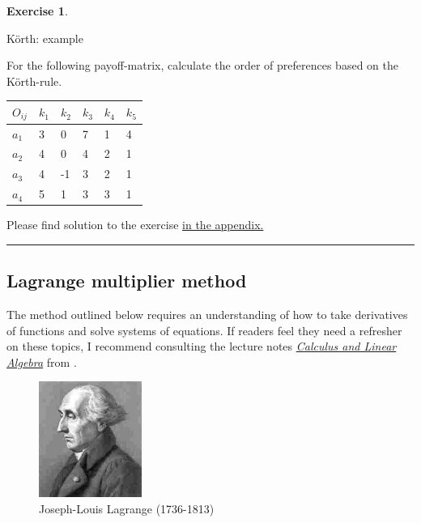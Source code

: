 \documentclass[
  12pt,
  oneside]{book}
\theoremstyle{definition}
\theoremstyle{definition}
\theoremstyle{definition}
\newtheorem{exercise}{Exercise}[chapter]
\theoremstyle{definition}
\theoremstyle{remark}
\begin{document}
\begin{exercise}
\protect\hypertarget{exr:koerth-example}{}\label{exr:koerth-example}

Körth: example

For the following payoff-matrix, calculate the order of preferences based on the Körth-rule.

\begin{longtable}[]{@{}llllll@{}}
\toprule\noalign{}
\(O_{ij}\) & \(k_1\) & \(k_2\) & \(k_3\) & \(k_4\) & \(k_5\) \\
\midrule\noalign{}
\endhead
\bottomrule\noalign{}
\endlastfoot
\(a_1\) & 3 & 0 & 7 & 1 & 4 \\
\(a_2\) & 4 & 0 & 4 & 2 & 1 \\
\(a_3\) & 4 & -1 & 3 & 2 & 1 \\
\(a_4\) & 5 & 1 & 3 & 3 & 1 \\
\end{longtable}

Please find solution to the exercise \hyperref[sol:koerth-example]{in the appendix.}

\begin{center}\rule{0.5\linewidth}{0.5pt}\end{center}

\end{exercise}

\subsection{Lagrange multiplier method}\label{lagrange-multiplier-method}

The method outlined below requires an understanding of how to take derivatives of functions and solve systems of equations. If readers feel they need a refresher on these topics, I recommend consulting the lecture notes \href{https://raw.githubusercontent.com/hubchev/courses/main/pdfs/cla_A4.pdf}{\emph{Calculus and Linear Algebra}} from \citet{Huber2023Mathematics}.

\begin{figure}
\centering
\includegraphics[width=0.3\textwidth,height=\textheight]{fig/Lagrange.jpg}
\caption[\label{fig:Lagrange} Joseph-Louis Lagrange (1736-1813)]{\label{fig:Lagrange} Joseph-Louis Lagrange (1736-1813)\footnotemark{}}
\end{figure}
\end{document}
